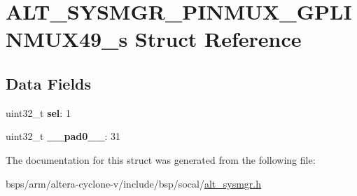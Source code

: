 \hypertarget{structALT__SYSMGR__PINMUX__GPLINMUX49__s}{}\section{A\+L\+T\+\_\+\+S\+Y\+S\+M\+G\+R\+\_\+\+P\+I\+N\+M\+U\+X\+\_\+\+G\+P\+L\+I\+N\+M\+U\+X49\+\_\+s Struct Reference}
\label{structALT__SYSMGR__PINMUX__GPLINMUX49__s}
\subsection*{Data Fields}
\begin{DoxyCompactItemize}
\item 
\mbox{\label{structALT__SYSMGR__PINMUX__GPLINMUX49__s_ac631427c146a759de63ba1754d5c09cf}} 
uint32\+\_\+t {\bfseries sel}\+: 1
\item 
\mbox{\label{structALT__SYSMGR__PINMUX__GPLINMUX49__s_a8fdc81ad07169df60f1dc2c8c1e0cc21}} 
uint32\+\_\+t {\bfseries \+\_\+\+\_\+pad0\+\_\+\+\_\+}\+: 31
\end{DoxyCompactItemize}


The documentation for this struct was generated from the following file\+:\begin{DoxyCompactItemize}
\item 
bsps/arm/altera-\/cyclone-\/v/include/bsp/socal/\mbox{\hyperlink{alt__sysmgr_8h}{alt\+\_\+sysmgr.\+h}}\end{DoxyCompactItemize}
